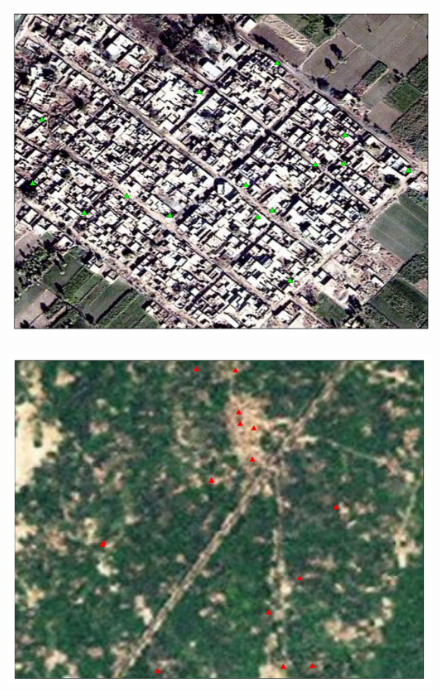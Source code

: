 \documentclass{beamer}
\begin{document}
\begin{frame}{}
	\begin{figure}[htb]
		\begin{center}
		\includegraphics[scale=0.4]{maps/concentrated.pdf}
		\end{center}
	\end{figure}
\end{frame}

\begin{frame}{}
	\begin{figure}[htb]
		\begin{center}
		\includegraphics[scale=0.4]{maps/disparate_farming.pdf}
		\end{center}
	\end{figure}
\end{frame}
\end{document}
